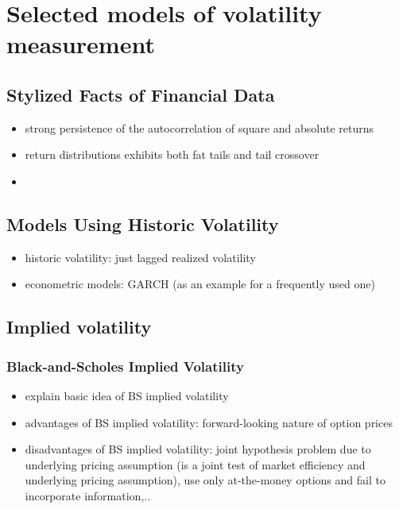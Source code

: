 
\section{Selected models of volatility measurement}

\subsection{Stylized Facts of Financial Data}
\begin{itemize}
\item strong persistence of the autocorrelation of square and absolute returns \parencite{jiang2003}
\item return distributions exhibits both fat tails and tail crossover \parencite{jian2003}
\item 
\end{itemize}

\subsection{Models Using Historic Volatility}
\begin{itemize}\itemsep0pt
\item historic volatility: just lagged realized volatility
\item econometric models: GARCH (as an example for a frequently used one)
\end{itemize}

\subsection{Implied volatility}
\subsubsection{Black-and-Scholes Implied Volatility}
\begin{itemize}\itemsep0pt
\item explain basic idea of BS implied volatility
\item advantages of BS implied volatility: forward-looking nature of option prices
\item disadvantages of BS implied volatility: joint hypothesis problem due to underlying  pricing assumption (is a joint test of market efficiency and underlying pricing assumption), use only at-the-money options and fail to incorporate information,..
\end{itemize}


